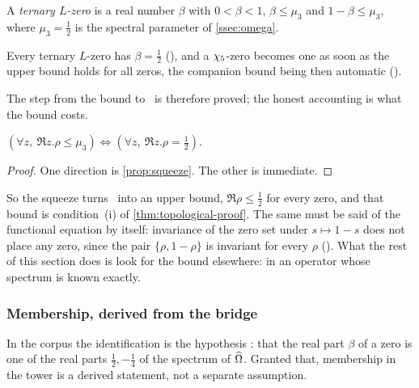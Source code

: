 \begin{definition}
A \emph{ternary $L$-zero} is a real number $\beta$ with $0<\beta<1$,
$\beta\le\mu_3$ and $1-\beta\le\mu_3$, where $\mu_3=\tfrac12$ is the spectral
parameter of \cref{ssec:omega}.  
\end{definition}

\begin{proposition}\label{prop:squeeze}
Every ternary $L$-zero has $\beta=\tfrac12$
(), and a $\chi_5$-zero becomes one as soon as the
upper bound holds for all zeros, the companion bound being then automatic
().
\end{proposition}

The step from the bound to \Ecore\ is therefore proved; the honest accounting is
what the bound costs.

\begin{proposition}\label{prop:premiseA}
$(\forall z,\ \Re z.\rho\le\mu_3)\iff(\forall z,\ \Re z.\rho=\tfrac12)$.
%
\end{proposition}
\begin{proof}
One direction is \cref{prop:squeeze}.  The other is immediate.
\end{proof}

So the squeeze turns \Ecore\ into an upper bound, $\Re\rho\le\tfrac12$ for every zero, and that bound is
condition~(i) of \cref{thm:topological-proof}.  The same must be said of the functional equation by
itself: invariance of the zero set under $s\mapsto1-s$ does not place any zero,
since the pair $\{\rho,1-\rho\}$ is invariant for every $\rho$
().  What the rest of this section
does is look for the bound elsewhere: in an operator whose spectrum is known
exactly.

\subsubsection{Membership, derived from the bridge}\label{ssec:membership}

In the corpus the identification is the hypothesis : that the
real part $\beta$ of a zero is one of the real parts $\tfrac12,-\tfrac14$ of the
spectrum of $\widehat{\Omega}$.  Granted that, membership in the tower is a derived statement,
not a separate assumption.

